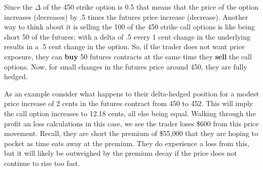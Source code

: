 \documentclass[
]{book}
\begin{document}
Since the \(\Delta\) of the 450 strike option is 0.5 that means that the price of the option increases (decreases) by .5 times the futures price increase (decrease). Another way to think about it is selling the 100 of the 450 strike call options is like being short 50 of the futures; with a delta of .5 every 1 cent change in the underlying results in a .5 cent change in the option. So, if the trader does not want price exposure, they can \textbf{buy} 50 futures contracts at the same time they \textbf{sell} the call options. Now, for small changes in the futures price around 450, they are fully hedged.

As an example consider what happens to their delta-hedged position for a modest price increase of 2 cents in the futures contract from 450 to 452. This will imply the call option increases to 12.18 cents, all else being equal. Walking through the profit an loss calculations in this case, we see the trader loses \$600 from this price movement. Recall, they are short the premium of \$55,000 that they are hoping to pocket as time eats away at the premium. They do experience a loss from this, but it will likely be outweighed by the premium decay if the price does not continue to rise too fast.
\end{document}
